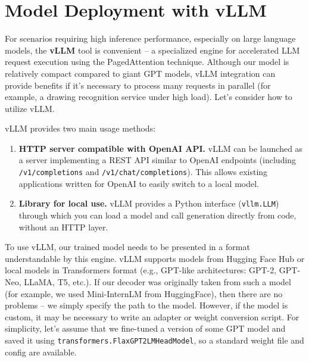 \documentclass{article}
\begin{document}
\section{Model Deployment with vLLM}

For scenarios requiring high inference performance, especially on large language models, the \textbf{vLLM} tool is convenient – a specialized engine for accelerated LLM request execution using the PagedAttention technique. Although our model is relatively compact compared to giant GPT models, vLLM integration can provide benefits if it's necessary to process many requests in parallel (for example, a drawing recognition service under high load). Let's consider how to utilize vLLM.

vLLM provides two main usage methods:
\begin{enumerate}
\item \textbf{HTTP server compatible with OpenAI API.} vLLM can be launched as a server implementing a REST API similar to OpenAI endpoints (including \texttt{/v1/completions} and \texttt{/v1/chat/completions}). This allows existing applications written for OpenAI to easily switch to a local model.
\item \textbf{Library for local use.} vLLM provides a Python interface (\texttt{vllm.LLM}) through which you can load a model and call generation directly from code, without an HTTP layer.
\end{enumerate}

To use vLLM, our trained model needs to be presented in a format understandable by this engine. vLLM supports models from Hugging Face Hub or local models in Transformers format (e.g., GPT-like architectures: GPT-2, GPT-Neo, LLaMA, T5, etc.). If our decoder was originally taken from such a model (for example, we used Mini-InternLM from HuggingFace), then there are no problems – we simply specify the path to the model. However, if the model is custom, it may be necessary to write an adapter or weight conversion script. For simplicity, let's assume that we fine-tuned a version of some GPT model and saved it using \texttt{transformers.FlaxGPT2LMHeadModel}, so a standard weight file and config are available.
\end{document}

